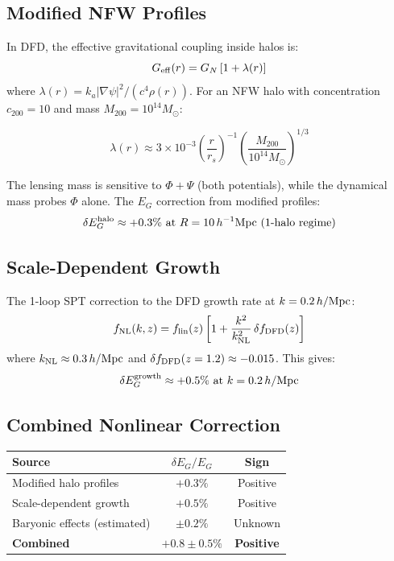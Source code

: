 \documentclass[11pt,a4paper]{article}
\begin{document}
\subsection{Modified NFW Profiles}

In DFD, the effective gravitational coupling inside halos is:
\begin{equation}
G_{\rm eff}(r) = G_N \left[ 1 + \lambda(r) \right]
\end{equation}
where $\lambda(r) = k_a |\nabla \psi|^2 / (c^4 \rho(r))$. For an NFW halo with concentration $c_{200} = 10$ and mass $M_{200} = 10^{14} M_\odot$:

\begin{equation}
\lambda(r) \approx 3 \times 10^{-3} \left( \frac{r}{r_s} \right)^{-1} \left( \frac{M_{200}}{10^{14} M_\odot} \right)^{1/3}
\end{equation}

The lensing mass is sensitive to $\Phi + \Psi$ (both potentials), while the dynamical mass probes $\Phi$ alone. The $E_G$ correction from modified profiles:
\begin{equation}
\delta E_G^{\rm halo} \approx +0.3\% \text{ at } R = 10 \, h^{-1} \text{Mpc (1-halo regime)}
\end{equation}

\subsection{Scale-Dependent Growth}

The 1-loop SPT correction to the DFD growth rate at $k = 0.2 \, h/{\rm Mpc}$:
\begin{equation}
f_{\rm NL}(k, z) = f_{\rm lin}(z) \left[ 1 + \frac{k^2}{k_{\rm NL}^2} \, \delta f_{\rm DFD}(z) \right]
\end{equation}
where $k_{\rm NL} \approx 0.3 \, h/{\rm Mpc}$ and $\delta f_{\rm DFD}(z=1.2) \approx -0.015$. This gives:
\begin{equation}
\delta E_G^{\rm growth} \approx +0.5\% \text{ at } k = 0.2 \, h/\text{Mpc}
\end{equation}

\subsection{Combined Nonlinear Correction}

\begin{center}
\begin{tabular}{lcc}
\toprule
\textbf{Source} & \textbf{$\delta E_G / E_G$} & \textbf{Sign} \\
\midrule
Modified halo profiles & $+0.3\%$ & Positive \\
Scale-dependent growth & $+0.5\%$ & Positive \\
Baryonic effects (estimated) & $\pm 0.2\%$ & Unknown \\
\midrule
\textbf{Combined} & $+0.8 \pm 0.5\%$ & \textbf{Positive} \\
\bottomrule
\end{tabular}
\end{center}
\end{document}
